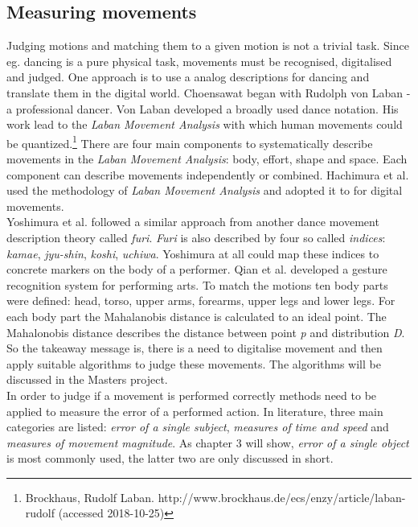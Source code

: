 \subsection{Measuring movements}
Judging motions and matching them to a given motion is not a trivial task. Since eg. dancing is a pure physical task, movements must be recognised, digitalised and judged. One approach is to use a analog descriptions for dancing and translate them in the digital world. Choensawat \cite{Choensawat2015} began with Rudolph von Laban - a professional dancer. Von Laban developed a broadly used dance notation. His work lead to the \textit{Laban Movement Analysis} with which human movements could be quantized.\footnote{Brockhaus, Rudolf Laban. http://www.brockhaus.de/ecs/enzy/article/laban-rudolf (accessed 2018-10-25)} There are four main components to systematically describe movements in the \textit{Laban Movement Analysis}: body, effort, shape and space. Each component can describe movements independently or combined. Hachimura et al. \cite{Hachimura2004} used the methodology  of \textit{Laban Movement Analysis} and adopted it to for digital movements.\\
Yoshimura et al. \cite{Yoshimura2006} followed a similar approach from another dance movement description theory called \textit{furi}. \textit{Furi} is also described by four so called \textit{indices}: \textit{kamae}, \textit{jyu-shin}, \textit{koshi}, \textit{uchiwa}. Yoshimura at all could map these indices to concrete markers on the body of a performer.
Qian et al. \cite{Qian2005} developed a gesture recognition system for performing arts. To match the motions ten body parts were defined: head, torso, upper arms, forearms, upper legs and lower legs. For each body part the Mahalanobis distance is calculated to an ideal point. The Mahalonobis distance describes the distance between point \textit{p} and distribution \textit{D}.\\
So the takeaway message is, there is a need to digitalise movement and then apply suitable algorithms to judge these movements. The algorithms will be discussed in the Masters project.\\

In order to judge if a movement is performed correctly methods need to be applied to measure the error of a performed action. In literature, three main categories are listed: \textit{error of a single subject}, \textit{measures of time and speed} and \textit{measures of movement magnitude}. As chapter 3 will show, \textit{error of a single object} is most commonly used, the latter two are only discussed in short. 
